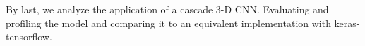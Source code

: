 By last, we analyze the application of a cascade 3-D CNN. Evaluating and profiling the model and comparing it to an equivalent implementation with keras-tensorflow.








